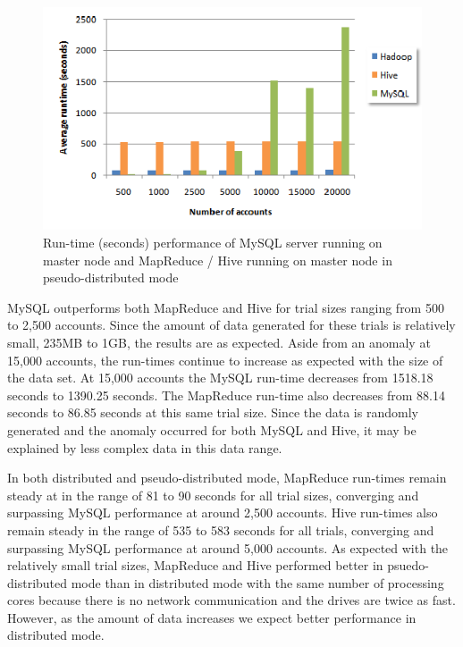 \begin{figure}[h!]
 \centering
 \includegraphics[width=\textwidth]{../images/runtime_vs_accountCount_pseudoDistributed.png}
 \caption{Run-time (seconds) performance of MySQL server running on master node and MapReduce / Hive running on master node in pseudo-distributed mode}
 \label{fig:allruntimespseudo}
\end{figure}

MySQL outperforms both MapReduce and Hive for trial sizes ranging from 500 to 2,500 accounts. Since the amount of data generated for these trials is relatively small, 235MB to 1GB, the results are as expected. Aside from an anomaly at 15,000 accounts, the run-times continue to increase as expected with the size of the data set. At 15,000 accounts the MySQL run-time decreases from 1518.18 seconds to 1390.25 seconds. The MapReduce run-time also decreases from 88.14 seconds to 86.85 seconds at this same trial size. Since the data is randomly generated and the anomaly occurred for both MySQL and Hive, it may be explained by less complex data in this data range.

In both distributed and pseudo-distributed mode, MapReduce run-times remain steady at in the range of 81 to 90 seconds for all trial sizes, converging and surpassing MySQL performance at around 2,500 accounts. Hive run-times also remain steady in the range of 535 to 583 seconds for all trials, converging and surpassing MySQL performance at around 5,000 accounts. As expected with the relatively small trial sizes, MapReduce and Hive performed better in psuedo-distributed mode than in distributed mode with the same number of processing cores because there is no network communication and the drives are twice as fast. However, as the amount of data increases we expect better performance in distributed mode.

